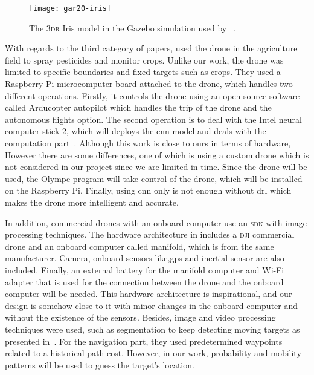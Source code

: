 \documentclass[../main.tex]{subfiles}
\begin{document}
\begin{figure}[tb] 
    \centering
    \texttt{[image: gar20-iris]} 
    \caption[The 3\textsc{dr} Iris model in the 
    Gazebo simulation used by \citeauthor{Gar20}.]
    {The 3\textsc{dr} Iris model in the 
    Gazebo simulation used by 
    \citeauthor{Gar20}~\cite[Fig.~4]{Gar20}.} 
    \label{fig:gar20} 
\end{figure}



With regards to the third category of papers,
\citeauthor{Khan21} used the drone in the agriculture field to spray 
pesticides and monitor crops. Unlike our work, the drone was limited to specific
boundaries and fixed targets such as crops.
They used a Raspberry Pi microcomputer board attached to the drone, which handles two different operations. Firstly, it controls the drone using an open-source
software called Arducopter autopilot which  handles the trip of the drone and the autonomous 
flights option. The second operation is to deal with the Intel neural computer stick 2, which will deploys the \gls{cnn} model and deals with the computation part~\cite{Khan21}.
Although this work is close to ours in terms of hardware, However there are some differences, 
one of which is using a custom drone which is not considered in our project since we are limited in time.
Since the \anafi drone will be used, the Olympe program will take control of the drone, which will
be installed on the Raspberry Pi. Finally, using \gls{cnn} only is not enough without \gls{drl} 
which makes the drone more intelligent and accurate.

In addition, commercial drones with an onboard computer use an \textsc{sdk} with image processing techniques.
The hardware architecture in \citeauthor{Wang18} includes a \textsc{dji} 
commercial drone and an onboard computer called manifold, which is from the same manufacturer.
Camera, onboard sensors like,\gls{gps} and inertial sensor are also included. Finally, an external battery for the manifold computer and Wi-Fi adapter that is used for the connection between the drone and the onboard computer will be needed. This hardware architecture is inspirational, and our design is somehow close to it with minor changes in the onboard computer and 
without the existence of the sensors. Besides, image and video processing techniques were used, such as 
segmentation to keep detecting moving targets as presented in~\cite{Wang18}.
For the navigation part, they used predetermined waypoints related to a historical path cost. 
However, in our work, probability and mobility patterns will be used to guess the target's location.
\end{document}
